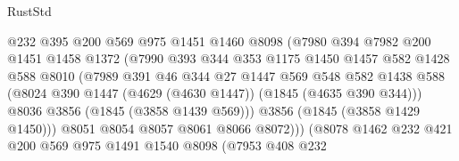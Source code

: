 \begin{lexlean}{RustStd}
\begin{coremodule}
                              @232
                              @395
                              @200
                              @569
                              @975
                              @1451
                              @1460
                              @8098
                              (@7980
                                @394
                                @7982
                                @200
                                @1451
                                @1458
                                @1372
                                (@7990
                                  @393
                                  @344
                                  @353
                                  @1175
                                  @1450
                                  @1457
                                  @582
                                  @1428
                                  @588
                                  @8010
                                  (@7989
                                    @391
                                    @46
                                    @344
                                    @27
                                    @1447
                                    @569
                                    @548
                                    @582
                                    @1438
                                    @588
                                    (@8024
                                      @390
                                      @1447
                                      (@4629 (@4630 @1447))
                                      (@1845 (@4635 @390 @344)))
                                    @8036
                                    @3856
                                    (@1845 (@3858 @1439 @569)))
                                  @3856
                                  (@1845 (@3858 @1429 @1450)))
                                @8051
                                @8054
                                @8057
                                @8061
                                @8066
                                @8072)))
                          (@8078
                            @1462
                            @232
                            @421
                            @200
                            @569
                            @975
                            @1491
                            @1540
                            @8098
                            (@7953
                              @408
                              @232

\end{coremodule}
\end{lexlean}
